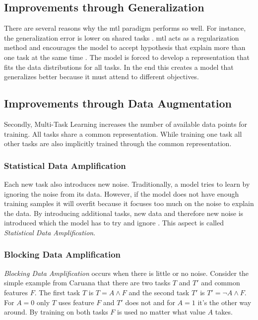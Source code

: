 \subsection{Improvements through Generalization}
\label{sec:03_mtlAdvantages}

There are several reasons why the \gls{mtl} paradigm performs so well. For instance, the generalization error is lower on shared tasks \cite{Caruana1993}. \gls{mtl} acts as a regularization method and encourages the model to accept hypothesis that explain more than one task at the same time \cite{Ruder2017}. The model is forced to develop a representation that fits the data distributions for all tasks. In the end this creates a model that generalizes better because it must attend to different objectives.

\subsection{Improvements through Data Augmentation}

Secondly, Multi-Task Learning increases the number of available data points for training. All tasks share a common representation. While training one task all other tasks are also implicitly trained through the common representation.

\subsubsection*{Statistical Data Amplification}

Each new task also introduces new noise. Traditionally, a model tries to learn by ignoring the noise from its data. However, if the model does not have enough training samples it will overfit because it focuses too much on the noise to explain the data. By introducing additional tasks, new data and therefore new noise is introduced which the model has to try and ignore \cite{Ruder2017}. This aspect is called \textit{Statistical Data Amplification}\cite{Caruana1995a}.

\subsubsection*{Blocking Data Amplification}

\textit{Blocking Data Amplification} occurs when there is little or no noise. Consider the simple example from Caruana \cite{Caruana1995a} that there are two tasks $T$ and $T'$ and common features $F$. The first task $T$ is $T = A \land F $ and the second task $T'$ is $T' = \neg A \land F$. For $A=0$ only $T$ uses feature $F$ and $T'$ does not and for $A=1$ it's the other way around. By training on both tasks $F$ is used no matter what value $A$ takes. 

